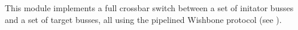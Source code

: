 This module implements a full crossbar switch between a set of initator
busses and a set of target busses, all using the pipelined Wishbone    
protocol (see ).                                                              
